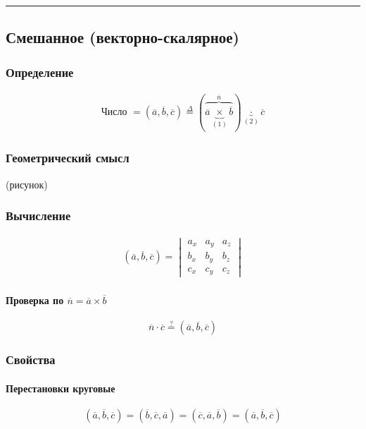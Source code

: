 \documentclass{article}
\begin{document}
\par\noindent\rule{\textwidth}{1pt}
\subsection{Смешанное (векторно-скалярное)}

\subsubsection{Определение}
\begin{gather*}
    \text{Число } = (\overline{a}, \overline{b}, \overline{c}) \overset{\Delta}{=}
    (\overbrace{\overline{a} \underbrace{\times}_{(1)} \overline{b}}^{\overline{n}}) \underbrace{\cdot}_{(2)} \overline{c}
\end{gather*}

\subsubsection{Геометрический смысл}
(рисунок)

\subsubsection{Вычисление}
\begin{gather*}
    (\overline{a}, \overline{b}, \overline{c}) =
    \begin{vmatrix}
        a_x & a_y & a_z \\
        b_x & b_y & b_z \\
        c_x & c_y & c_z
    \end{vmatrix}
\end{gather*}
\paragraph{Проверка по $\overline{n} = \overline{a} \times \overline{b}$}
\[
    \overline{n} \cdot \overline{c} \overset{?}{=} (\overline{a}, \overline{b}, \overline{c})
\]


\subsubsection{Свойства}

\paragraph{Перестановки круговые}
\[
    (\overline{a}, \overline{b}, \overline{c}) =
    (\overline{b}, \overline{c}, \overline{a}) =
    (\overline{c}, \overline{a}, \overline{b}) =
    (\overline{a}, \overline{b}, \overline{c})
\]
\end{document}
